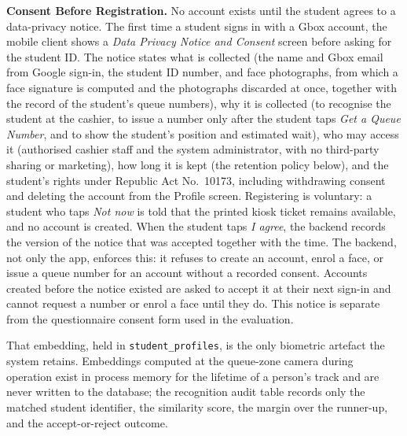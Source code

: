 \documentclass{research}
\begin{document}
\textbf{Consent Before Registration.}\label{cr:consent} No account exists until the student
agrees to a data-privacy notice. The first time a student signs in with a
Gbox account, the mobile client shows a \emph{Data Privacy Notice and
Consent} screen before asking for the student ID. The notice states what
is collected (the name and Gbox email from Google sign-in, the student ID
number, and face photographs, from which a face signature is computed
and the photographs discarded at once, together with the record of the
student's queue numbers), why it is collected (to recognise the student
at the cashier, to issue a number only after the student taps \emph{Get a
Queue Number}, and to show the student's position and estimated wait),
who may access it (authorised cashier staff and the system administrator,
with no third-party sharing or marketing), how long it is kept (the
retention policy below), and the student's rights under Republic Act
No.~10173, including withdrawing consent and deleting the account from
the Profile screen. Registering is voluntary: a student who taps
\emph{Not now} is told that the printed kiosk ticket remains available,
and no account is created. When the student taps \emph{I agree}, the
backend records the version of the notice that was accepted together with
the time. The backend, not only the app, enforces this: it refuses to
create an account, enrol a face, or issue a queue number for an account
without a recorded consent. Accounts created before the notice existed
are asked to accept it at their next sign-in and cannot request a number
or enrol a face until they do. This notice is separate from the
questionnaire consent form used in the evaluation.

That embedding, held in \texttt{student\_profiles}, is the only biometric
artefact the system retains. Embeddings computed at the queue-zone camera
during operation exist in process memory for the lifetime of a person's
track and are never written to the database; the recognition audit table
records only the matched student identifier, the similarity score, the
margin over the runner-up, and the accept-or-reject outcome.
\end{document}
